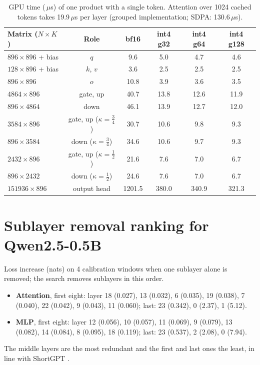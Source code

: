 \documentclass[11pt]{article}
\newcommand{\us}{\,$\mu$s}
\begin{document}
\begin{table}[htbp]
\centering
\small
\begin{tabular}{lccccc}
\toprule
Matrix ($N\times K$) & Role & bf16 & int4 g32 & int4 g64 & int4 g128 \\
\midrule
$896\times896$ + bias    & $q$                          & 9.6    & 5.0   & 4.7   & 4.6   \\
$128\times896$ + bias    & $k$, $v$                     & 3.6    & 2.5   & 2.5   & 2.5   \\
$896\times896$           & $o$                          & 10.8   & 3.9   & 3.6   & 3.5   \\
$4864\times896$          & gate, up                     & 40.7   & 13.8  & 12.6  & 11.9  \\
$896\times4864$          & down                         & 46.1   & 13.9  & 12.7  & 12.0  \\
$3584\times896$          & gate, up ($\kappa=\tfrac34$) & 30.7   & 10.6  & 9.8   & 9.3   \\
$896\times3584$          & down ($\kappa=\tfrac34$)     & 34.6   & 10.6  & 9.7   & 9.3   \\
$2432\times896$          & gate, up ($\kappa=\tfrac12$) & 21.6   & 7.6   & 7.0   & 6.7   \\
$896\times2432$          & down ($\kappa=\tfrac12$)     & 24.6   & 7.6   & 7.0   & 6.7   \\
$151936\times896$        & output head                  & 1201.5 & 380.0 & 340.9 & 321.3 \\
\bottomrule
\end{tabular}
\caption{GPU time (\us) of one product with a single token. Attention over 1024 cached tokens takes
19.9\us{} per layer (grouped implementation; SDPA: 130.6\us).}
\label{tab:table}
\end{table}

\section{Sublayer removal ranking for Qwen2.5-0.5B}
\label{app:removal}

Loss increase (nats) on 4 calibration windows when one sublayer alone is removed; the search removes
sublayers in this order.
\begin{itemize}
  \item \textbf{Attention}, first eight: layer 18 (0.027), 13 (0.032), 6 (0.035), 19 (0.038), 7 (0.040),
        22 (0.042), 9 (0.043), 11 (0.060); last: 23 (0.342), 0 (2.37), 1 (5.12).
  \item \textbf{MLP}, first eight: layer 12 (0.056), 10 (0.057), 11 (0.069), 9 (0.079), 13 (0.082),
        14 (0.084), 8 (0.095), 18 (0.119); last: 23 (0.537), 2 (2.08), 0 (7.94).
\end{itemize}
The middle layers are the most redundant and the first and last ones the least, in line with
ShortGPT \cite{men2024shortgpt}.



\end{document}
